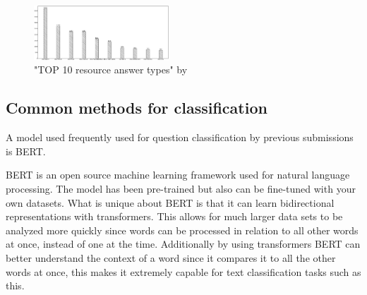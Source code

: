 \documentclass[sigconf]{acmart}
\begin{document}
\begin{figure}[h]
    \includegraphics[width=0.45\textwidth]{figures/top10ResourceAnswerTypes.png}
    \caption{"TOP 10 resource answer types" by \citet{Kothen:analysis}}
    \label{figure:top10resourceanswertypes}
\end{figure}

\subsection{Common methods for classification}
A model used frequently used for question classification by previous submissions is \gls{BERT}\cite{maastricht:bert}\cite{heraklion:bert}\cite{tokyo:bert}\cite{uis:bert}\cite{Kothen:analysis}. 

\gls{BERT} is an open source machine learning framework used for natural language processing. The model has been pre-trained but also can be fine-tuned with your own datasets. What is unique about BERT is that it can learn bidirectional representations with transformers. This allows for much larger data sets to be analyzed more quickly since words can be processed in relation to all other words at once, instead of one at the time. Additionally by using transformers \gls{BERT} can better understand the context of a word since it compares it to all the other words at once, this makes it extremely capable for text classification tasks such as this.\cite{nvidia:bert}



\end{document}

